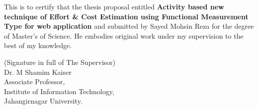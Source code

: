 
This is to certify that the thesis proposal entitled \textbf{Activity based new technique of Effort \& Cost Estimation using Functional Measurement Type for web application} and submitted by Sayed Mohsin Reza for the degree of Master's of Science. He embodies original work under my supervision to the best of my knowledge.

\bigskip
\bigskip
\bigskip
\bigskip
\bigskip
\bigskip

\noindent (Signature in full of
The Supervisor)
 \\
  Dr. M Shamim Kaiser \\ Associate Professor,  \\
  Institute of Information Technology,\\
  Jahangirnagar University.\\

